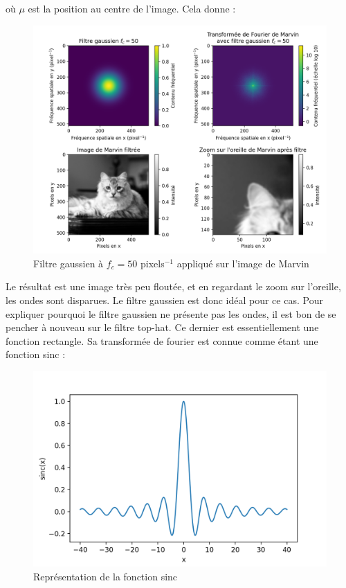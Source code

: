 \documentclass[11pt,letterpaper]{article}
\begin{document}
où $\mu$ est la position au centre de l'image. Cela donne :

\begin{figure}[H]
  \centering
  \includegraphics[scale=0.7]{marvin_gauss_fc_50.png}
  \caption{Filtre gaussien à $f_c = 50$ pixels$^{-1}$ appliqué sur l'image de Marvin}
  \label{gauss}
\end{figure}

Le résultat est une image très peu floutée, et en regardant le zoom sur l'oreille, les ondes sont disparues. Le filtre gaussien est donc idéal pour ce cas. Pour expliquer pourquoi le filtre gaussien ne présente pas les ondes, il est bon de se pencher à nouveau sur le filtre top-hat. Ce dernier est essentiellement une fonction rectangle. Sa transformée de fourier est connue comme étant une fonction sinc :

\begin{figure}[H]
  \centering
  \includegraphics[scale=0.7]{sinc.png}
  \caption{Représentation de la fonction sinc}
  \label{sinc}
\end{figure}
\end{document}
